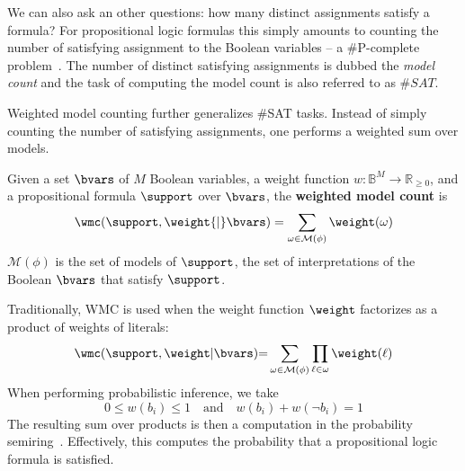 We can also ask an other questions: how many distinct assignments satisfy a formula? For propositional logic formulas this simply amounts to counting the number of satisfying assignment to the Boolean variables --  a \#P-complete problem~\citep{valiant1979complexity}. The number of distinct satisfying assignments is dubbed the \textit{model count} and the task of computing the model count is also referred to as $\#SAT$.

Weighted model counting further generalizes \#SAT tasks. Instead of simply counting the number of satisfying assignments, one performs a weighted sum over models.
\begin{definition} \label{def:wmc} Given a set $\bvars$ of $M$ Boolean variables, a weight function $w: \mathbb{B}^M \rightarrow \mathbb{R}_{\geq 0}$, and a propositional formula $\support$ over $\bvars$, the {\bf weighted model count} is
	\begin{align}\label{eqn:wmc}
	 \wmc(\support,\weight {\mid} \bvars) = \sum_{\omega \in \mathcal{M}(\phi)} \weight(\omega)
	\end{align}
	$\mathcal{M}(\phi)$ is the set of models of $\support$, \ie the set of interpretations of the Boolean $\bvars$ that satisfy $\support$.
\end{definition}
Traditionally, WMC is used when the weight function $\weight$ factorizes as a product of weights of literals:
\begin{equation}
 \wmc(\support, \weight |\bvars) {=} \sum_{\omega \in \mathcal{M}(\phi)} \prod_{\ell \in \omega} \weight(\ell)
\end{equation}
When performing probabilistic inference, we take
\begin{equation}
0 {\leq} w(b_i){\leq} 1 \quad\text{and}\quad w(b_i){+}w(\neg b_i)=1
\end{equation}
The resulting sum over products is then a computation in the probability semiring~\citep{kimmig2017algebraic}. Effectively, this computes the probability that a propositional logic formula is satisfied.

